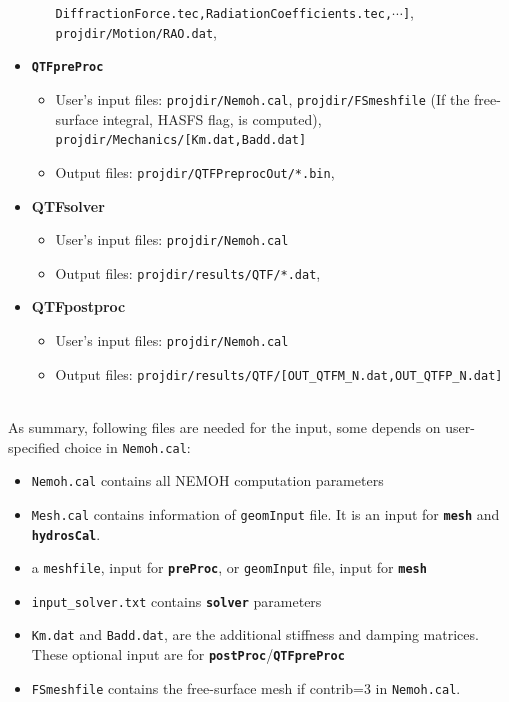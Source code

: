 \documentclass[12pt,a4paper,titlepage]{article}
\begin{document}
\begin{itemize}
\begin{itemize}
\texttt{DiffractionForce.tec,RadiationCoefficients.tec,$\cdots$]},\\ \texttt{projdir/Motion/RAO.dat},
\end{itemize}
\item \texttt{\textbf{QTFpreProc}}
\begin{itemize}
\item User's input files: \texttt{projdir/Nemoh.cal}, \texttt{projdir/FSmeshfile} (If the free-surface integral, HASFS flag, is computed), \\ \texttt{projdir/Mechanics/[Km.dat,Badd.dat]}
\item Output files: \texttt{projdir/QTFPreprocOut/*.bin},
\end{itemize}
\item \textbf{QTFsolver}
\begin{itemize}
\item User's input files: \texttt{projdir/Nemoh.cal}
\item Output files: \texttt{projdir/results/QTF/*.dat},
\end{itemize}
\item \textbf{QTFpostproc}
\begin{itemize}
\item User's input files: \texttt{projdir/Nemoh.cal}
\item Output files: \texttt{projdir/results/QTF/[OUT\_QTFM\_N.dat,OUT\_QTFP\_N.dat]}
\end{itemize}
\end{itemize}
\ \\
As summary, following files are needed for the input, some depends on user-specified choice in \texttt{Nemoh.cal}:
\begin{itemize}
\item \texttt{Nemoh.cal} contains all NEMOH computation parameters
\item \texttt{Mesh.cal} contains information of \texttt{geomInput} file. It is an input for \texttt{\textbf{mesh}} and \texttt{\textbf{hydrosCal}}.
\item a \texttt{meshfile}, input for \texttt{\textbf{preProc}}, or \texttt{geomInput} file, input for \texttt{\textbf{mesh}}
\item  \texttt{input\_solver.txt} contains \texttt{\textbf{solver}} parameters
\item \texttt{Km.dat} and \texttt{Badd.dat}, are the additional stiffness and damping matrices. These optional input are for \texttt{\textbf{postProc}}/\texttt{\textbf{QTFpreProc}}
\item \texttt{{FSmeshfile}} contains the free-surface mesh if contrib=3 in \texttt{Nemoh.cal}.
\end{itemize}
\end{document}

